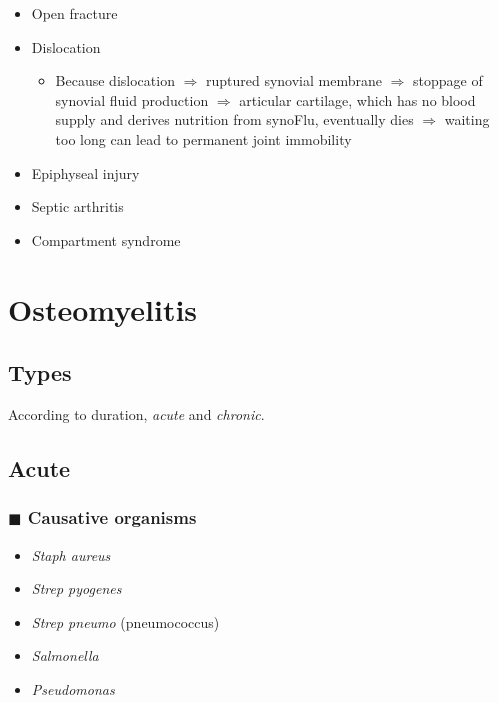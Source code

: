 \documentclass[
  14pt,
]{memoir}
\providecommand{\tightlist}{%
  \setlength{\itemsep}{0pt}\setlength{\parskip}{0pt}}
\begin{document}
\begin{itemize}
\tightlist
\item
  Open fracture
\item
  Dislocation

  \begin{itemize}
  \tightlist
  \item
    Because dislocation \(\Rightarrow\) ruptured synovial membrane
    \(\Rightarrow\) stoppage of synovial fluid production
    \(\Rightarrow\) articular cartilage, which has no blood supply and
    derives nutrition from synoFlu, eventually dies \(\Rightarrow\)
    waiting too long can lead to permanent joint immobility
  \end{itemize}
\item
  Epiphyseal injury
\item
  Septic arthritis
\item
  Compartment syndrome
\end{itemize}

\pagebreak

\hypertarget{osteomyelitis}{%
\section{Osteomyelitis}\label{osteomyelitis}}

\hypertarget{types-2}{%
\subsection{Types}\label{types-2}}

According to duration, \emph{acute} and \emph{chronic}.

\hypertarget{acute}{%
\subsection{Acute}\label{acute}}

\hypertarget{blacksquare-causative-organisms}{%
\subsubsection{\texorpdfstring{\(\blacksquare\) Causative
organisms}{\textbackslash blacksquare Causative organisms}}\label{blacksquare-causative-organisms}}

\begin{itemize}
\tightlist
\item
  \emph{Staph aureus}
\item
  \emph{Strep pyogenes}
\item
  \emph{Strep pneumo} (pneumococcus)
\item
  \emph{Salmonella}
\item
  \emph{Pseudomonas}
\end{itemize}
\end{document}
